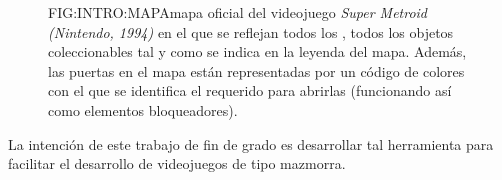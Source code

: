 \begin{figure}{FIG:INTRO:MAPA}{mapa oficial del videojuego \textit{Super Metroid (Nintendo, 1994)} en el que se reflejan todos los , todos los objetos coleccionables tal y como se indica en la leyenda del mapa. Además, las puertas en el mapa están representadas por un código de colores con el que se identifica el  requerido para abrirlas (funcionando así como elementos bloqueadores).}
\end{figure}

La intención de este trabajo de fin de grado es desarrollar tal herramienta para facilitar el desarrollo de videojuegos de tipo mazmorra.